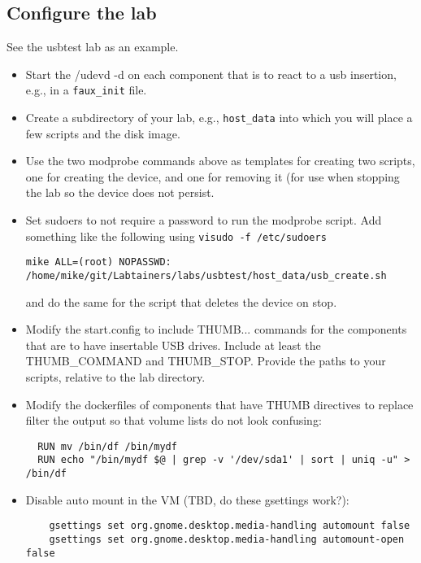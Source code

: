 \documentclass[12pt]{article}
\begin{document}
\subsection{Configure the lab}
See the usbtest lab as an example.
\begin{itemize}
\item Start the {\sbin/udevd -d} on each component that is to react to a usb insertion, e.g., in a {\tt faux\_init} file.
\item Create a subdirectory of your lab, e.g., {\tt host\_data} into which you will place a few scripts and the disk image.
\item Use the two modprobe commands above as templates for creating two scripts, one for creating the device, and one for removing it (for use
when stopping the lab so the device does not persist.
\item Set sudoers to not require a password to run the modprobe script.  Add
something like the following using {\tt visudo -f /etc/sudoers}
\begin{verbatim}
mike ALL=(root) NOPASSWD: /home/mike/git/Labtainers/labs/usbtest/host_data/usb_create.sh
\end{verbatim}
\noindent and do the same for the script that deletes the device on stop.

\item Modify the start.config to include THUMB... commands for the components that are to have insertable USB drives.
Include at least the THUMB\_COMMAND and THUMB\_STOP.  Provide the paths to your scripts, relative to the lab directory.

\item Modify the dockerfiles of components that have THUMB directives to replace filter the {\df} output so that volume lists do not look confusing:
\begin{verbatim}
  RUN mv /bin/df /bin/mydf
  RUN echo "/bin/mydf $@ | grep -v '/dev/sda1' | sort | uniq -u" > /bin/df
\end{verbatim}

\item Disable auto mount in the VM (TBD, do these gsettings work?):
\begin{verbatim}
    gsettings set org.gnome.desktop.media-handling automount false
    gsettings set org.gnome.desktop.media-handling automount-open false 
\end{verbatim}

\end{itemize}
\end{document}
